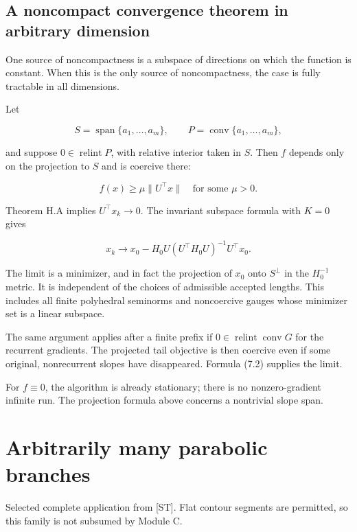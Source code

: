 \documentclass[10pt,oneside,openany]{book}
\newcommand{\ModuleTag}{I}
\theoremstyle{remark}\newtheorem{remark}{Remark}[chapter]
\newcommand{\StartModule}[3]{\cleardoublepage\renewcommand{\ModuleTag}{#1}\chapter{#2}\label{#1:chapter}\begin{small}\color{Accent}#3\end{small}\par\vspace{3pt}{\color{RuleGray}\hrule}\vspace{9pt}}
\begin{document}
\setcounter{section}{7}
\setcounter{theorem}{0}
\setcounter{lemma}{0}
\setcounter{corollary}{0}
\setcounter{proposition}{0}
\setcounter{remark}{0}
\setcounter{equation}{0}
\section{A noncompact convergence theorem in arbitrary
dimension}\label{H:a-noncompact-convergence-theorem-in-arbitrary-dimension}

One source of noncompactness is a subspace of directions on which the
function is constant. When this is the only source of noncompactness,
the case is fully tractable in all dimensions.

Let

\[
S=\operatorname{span}\{a_1,\ldots,a_m\},\qquad
P=\operatorname{conv}\{a_1,\ldots,a_m\},
\]

and suppose \(0\in\operatorname{relint}P\), with relative interior taken
in \(S\). Then \(f\) depends only on the projection to \(S\) and is
coercive there:

\[
f(x)\ge\mu\|U^\top x\|\quad\text{for some }\mu>0.
\]

Theorem H.A implies \(U^\top x_k\to0\). The invariant subspace formula
with \(K=0\) gives

\[
\boxed{
x_k\longrightarrow
x_0-H_0U(U^\top H_0U)^{-1}U^\top x_0.
}
\tag{H.8.1}
\]

The limit is a minimizer, and in fact the projection of \(x_0\) onto
\(S^\perp\) in the \(H_0^{-1}\) metric. It is independent of the choices
of admissible accepted lengths. This includes all finite polyhedral
seminorms and noncoercive gauges whose minimizer set is a linear
subspace.

The same argument applies after a finite prefix if
\(0\in\operatorname{relint}\operatorname{conv}G\) for the recurrent
gradients. The projected tail objective is then coercive even if some
original, nonrecurrent slopes have disappeared. Formula (7.2) supplies
the limit.

For \(f\equiv0\), the algorithm is already stationary; there is no
nonzero-gradient infinite run. The projection formula above concerns a
nontrivial slope span.


\endgroup


\StartModule{Q}{Arbitrarily many parabolic branches}{Selected complete application from [ST]. Flat contour segments are permitted, so this family is not subsumed by Module C.}
\end{document}
